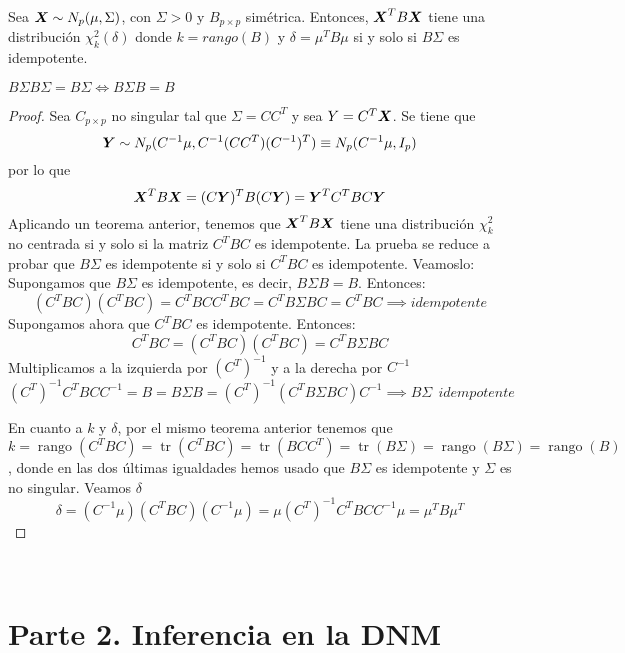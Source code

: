 \begin{nth}
  Sea $\boldsymbol{X} \sim N_p(\mu,\Sigma)$, con $\Sigma > 0$ y $B_{p\times p}$ simétrica. Entonces, $\boldsymbol{X}^T B \boldsymbol{X}$ tiene una distribución $\chi_k^2(\delta)$ donde $k = rango(B)$ y $\delta = \mu^T B \mu$ si y solo si $B\Sigma$ es idempotente.
  \begin{nota}
    $B\Sigma B\Sigma = B\Sigma \iff B\Sigma B = B$
  \end{nota}
\end{nth}
\begin{proof}
  Sea $C_{p\times p }$ no singular tal que $\Sigma = C C^T$ y sea $Y = C^T \boldsymbol{X}$. Se tiene que
  \[
  \boldsymbol{Y} \sim N_p(C^{-1}\mu, C^{-1}(CC^T)(C^{-1})^T) \equiv N_p(C^{-1}\mu, I_p)
  \]
  por lo que
  \[
  \boldsymbol{X}^T B \boldsymbol{X} = (C\boldsymbol{Y})^TB(C\boldsymbol{Y}) = \boldsymbol{Y}^T C^T B C \boldsymbol{Y}
  \]
  Aplicando un teorema anterior, tenemos que $\boldsymbol{X}^T B \boldsymbol{X}$ tiene una distribución $\chi^2_k$ no centrada si y solo si la matriz $C^T B C$ es idempotente. La prueba se reduce a probar que $B\Sigma$ es idempotente si y solo si $C^T B C$ es idempotente. Veamoslo:\\

  \boxed{\rightarrow} Supongamos que $B\Sigma$ es idempotente, es decir, $B\Sigma B = B$. Entonces:
  \[
  (C^TBC)(C^TBC) = C^TBCC^TBC = C^TB\Sigma BC = C^TBC \implies idempotente
  \]
  \boxed{\leftarrow} Supongamos ahora que $C^TBC$ es idempotente. Entonces:
  \[
  C^TBC = (C^TBC)(C^TBC) = C^TB\Sigma B C
  \]
  Multiplicamos a la izquierda por $(C^T)^{-1}$ y a la derecha por $C^{-1}$
  \[
  (C^T)^{-1}C^TBCC^{-1} = B = B\Sigma B = (C^T)^{-1}(C^T B \Sigma B C)C^{-1} \implies B \Sigma \ \ idempotente
  \]

  En cuanto a $k$ y $\delta$, por el mismo teorema anterior tenemos que
  \[
  k = \operatorname{rango}(C^T B C) = \operatorname{tr}(C^TBC) = \operatorname{tr}(BCC^T) = \operatorname{tr}(B\Sigma) = \operatorname{rango}(B\Sigma) = \operatorname{rango}(B)
  \], donde en las dos últimas igualdades hemos usado que $B\Sigma$ es idempotente y $\Sigma$ es no singular. Veamos $\delta$
  \[
  \delta = (C^{-1} \mu)(C^T B C)(C^{-1}\mu) = \mu(C^T)^{-1}C^T B CC^{-1}\mu = \mu^T B \mu^T
  \]
\end{proof}

\


\section{Parte 2. Inferencia en la DNM}
